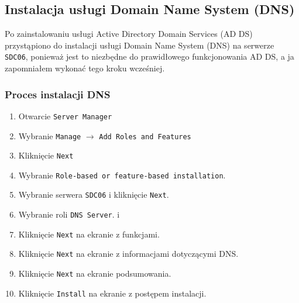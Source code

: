\clearpage
{}
\clearpage
{}
\clearpage
{}
\clearpage
{}
\clearpage


\subsection{Instalacja usługi Domain Name System (DNS)}
Po zainstalowaniu usługi Active Directory Domain Services (AD DS) przystąpiono do instalacji usługi Domain Name System (DNS) na serwerze \texttt{SDC06}, ponieważ jest to niezbędne do prawidłowego funkcjonowania AD DS, a ja zapomniałem wykonać tego kroku wcześniej.
\subsubsection{Proces instalacji DNS}
\begin{enumerate}
	\item Otwarcie \texttt{Server Manager}
	\item Wybranie \texttt{Manage} $\rightarrow$ \texttt{Add Roles and Features}
	\item Kliknięcie \texttt{Next}
	\item Wybranie \texttt{Role-based or feature-based installation}. 
	\item Wybranie serwera \texttt{SDC06} i kliknięcie \texttt{Next}. 
	\item Wybranie roli \texttt{DNS Server}. i 
	\item Kliknięcie \texttt{Next} na ekranie z funkcjami. 
	\item Kliknięcie \texttt{Next} na ekranie z informacjami dotyczącymi DNS.
	\item Kliknięcie \texttt{Next} na ekranie podsumowania. 
	\item Kliknięcie \texttt{Install} na ekranie z postępem instalacji. 
\end{enumerate}

